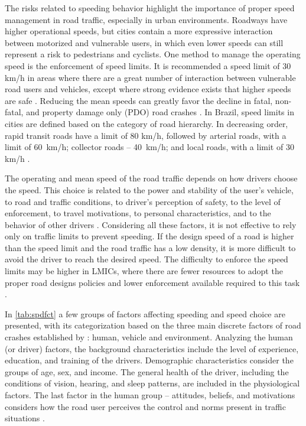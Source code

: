 The risks related to speeding behavior highlight the importance of proper speed management in road traffic, especially in urban environments. Roadways have higher operational speeds, but cities contain a more expressive interaction between motorized and vulnerable users, in which even lower speeds can still represent a risk to pedestrians and cyclists. One method to manage the operating speed is the enforcement of speed limits. It is recommended a speed limit of 30 km/h in areas where there are a great number of interaction between vulnerable road users and vehicles, except where strong evidence exists that higher speeds are safe \cite{WHO2020,whoGlobalPlanDecade2021}. Reducing the mean speeds can greatly favor the decline in fatal, non-fatal, and property damage only (PDO) road crashes \cite{Elvik2013}. In Brazil, speed limits in cities are defined based on the category of road hierarchy. In decreasing order, rapid transit roads have a limit of 80 km/h, followed by arterial roads, with a limit of 60 km/h; collector roads – 40 km/h; and local roads, with a limit of 30 km/h \cite{Brasil1997}.

The operating and mean speed of the road traffic depends on how drivers choose the speed. This choice is related to the power and stability of the user's vehicle, to road and traffic conditions, to driver's perception of safety, to the level of enforcement, to travel motivations, to personal characteristics, and to the behavior of other drivers \cite{Mohan2016a, Shinar2017}. Considering all these factors, it is not effective to rely only on traffic limits to prevent speeding. If the design speed of a road is higher than the speed limit and the road traffic has a low density, it is more difficult to avoid the driver to reach the desired speed. The difficulty to enforce the speed limits may be higher in LMICs, where there are fewer resources to adopt the proper road designs policies and lower enforcement available required to this task \cite{Mohan2016a}. 

In \autoref{tab:spdfct} a few groups of factors affecting speeding and speed choice are presented, with its categorization based on the three main discrete factors of road crashes established by \textcite{Haddon1980}: human, vehicle and environment. Analyzing the human (or driver) factors, the background characteristics include the level of experience, education, and training of the drivers. Demographic characteristics consider the groups of age, sex, and income. The general health of the driver, including the conditions of vision, hearing, and sleep patterns, are included in the physiological factors. The last factor in the human group – attitudes, beliefs, and motivations considers how the road user perceives the control and norms present in traffic situations \cite{Richard2013a}.  

